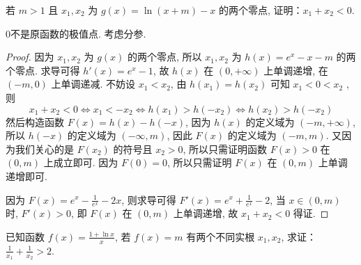 \begin{example}
    若 $m > 1$ 且 $x_1, x_2$ 为 $g(x) = \ln(x+m) - x$ 的两个零点, 证明：$x_1 + x_2 < 0$. 
\end{example}
\begin{analyse}
    \(0\)不是原函数的极值点. 考虑分参. 
\end{analyse}
\begin{proof}
    因为 $x_1, x_2$ 为 $g(x)$ 的两个零点, 所以 $x_1, x_2$ 为 $h(x) = e^x - x - m$ 的两个零点. 求导可得 $h'(x) = e^x - 1$, 故 $h(x)$ 在 $(0, +\infty)$ 上单调递增, 在 $(-m, 0)$ 上单调递减. 不妨设 $x_1 < x_2$, 由 $h(x_1) = h(x_2)$ 可知 $x_1 < 0 < x_2$
, 则
\[
x_1 + x_2 < 0 
\Leftrightarrow x_1 < -x_2 \Leftrightarrow h(x_1) > h(-x_2) \Leftrightarrow
 h(x_2) > h(-x_2)
\]
然后构造函数 
$F(x) = h(x) - h(-x)$, 因为 $h(x)$ 的定义域为 $(-m, +\infty)$, 所以 $h(-x)$ 的定义域为 $(-\infty, m)$, 因此 $F(x)$ 的定义域为 $(-m, m)$. 又因为我们关心的是 $F(x_2)$ 的符号且 $x_2 > 0$, 所以只需证明函数 $F(x) > 0$ 在 $(0, m)$ 上成立即可. 因为 $F(0) = 0$, 所以只需证明 $F(x)$ 在 $(0, m)$
 上单调递增即可. 

因为 
$F(x) = e^x - \frac{1}{e^x} - 2x$, 则求导可得 $F'(x) = e^x + \frac{1}{e^x} - 2$, 当 $x \in (0, m)$ 时, $F'(x) > 0$, 即 $F(x)$ 在 $(0, m)$ 上单调递增, 故 $x_1 + x_2 < 0$
 得证. 

\end{proof}

\begin{example}
    已知函数 $f(x) = \frac{1 + \ln x}{x}$, 若 $f(x) = m$ 有两个不同实根 $x_1, x_2$, 求证：$\frac{1}{x_1} + \frac{1}{x_2} > 2$. 
\end{example}

